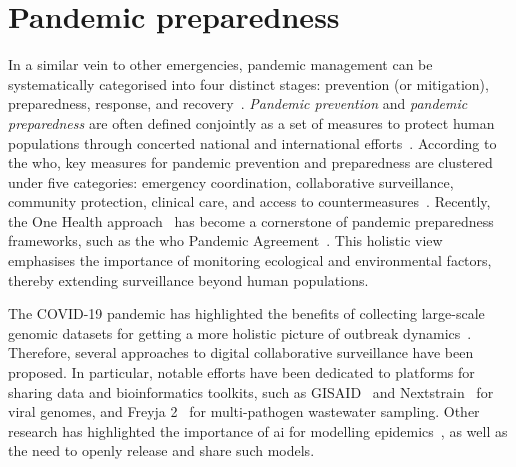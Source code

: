 \section{Pandemic preparedness}

In a similar vein to other emergencies, pandemic management can be systematically categorised into four distinct stages: prevention (or mitigation), preparedness, response, and recovery~\cite{alexander2002, coppola2006}. \emph{Pandemic prevention} and \textit{pandemic preparedness} are often defined conjointly as a set of measures to protect human populations through concerted national and international efforts~\cite{paho2024}. According to the \gls{who}, key measures for pandemic prevention and preparedness are clustered under five categories: emergency coordination, collaborative surveillance, community protection, clinical care, and access to countermeasures~\cite{who2023, paho2024, who2025}. Recently, the One Health approach~\cite{onehealth2008} has become a cornerstone of pandemic preparedness frameworks, such as the \gls{who} Pandemic Agreement~\cite{who2025}. This holistic view emphasises the importance of monitoring ecological and environmental factors, thereby extending surveillance beyond human populations.

The COVID-19 pandemic has highlighted the benefits of collecting large-scale genomic datasets for getting a more holistic picture of outbreak dynamics~\cite{grenfell2004, attwood2022, silva2023, burki2024}. Therefore, several approaches to digital collaborative surveillance have been proposed. In particular, notable efforts have been dedicated to platforms for sharing data and bioinformatics toolkits, such as GISAID~\cite{shu2017} and Nextstrain~\cite{hadfield2018} for viral genomes, and Freyja 2~\cite{levy2025} for multi-pathogen wastewater sampling. Other research has highlighted the importance of \gls{ai} for modelling epidemics~\cite{kraemer2025}, as well as the need to openly release and share such models. 

